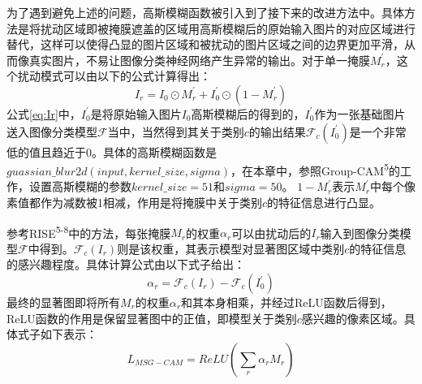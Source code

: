 为了遇到避免上述的问题，高斯模糊函数被引入到了接下来的改进方法中。具体方法是将扰动区域即被掩膜遮盖的区域用高斯模糊后的原始输入图片的对应区域进行替代，这样可以使得凸显的图片区域和被扰动的图片区域之间的边界更加平滑，从而像真实图片，不易让图像分类神经网络产生异常的输出。对于单一掩膜$M^{\prime}_r$，这个扰动模式可以由以下的公式计算得出：
\begin{equation}
	I_r=I_0\odot M^{\prime}_r+I^{\prime}_0\odot (1-M^{\prime}_r)
	\label{eq:Ir}
\end{equation}
公式\ref{eq:Ir}中，$I^{\prime}_0$是将原始输入图片$I_0$高斯模糊后的得到的，$I^{\prime}_0$作为一张基础图片送入图像分类模型$\mathcal{F}$当中，当然得到其关于类别$c$的输出结果$\mathcal{F}_c(I^{\prime}_0)$是一个非常低的值且趋近于0。具体的高斯模糊函数是$guassian\_blur2d(input,kernel\_size,sigma)$，在本章中，参照Group-CAM\textsuperscript{\cite{zhang2021novel}5}的工作，设置高斯模糊的参数$kernel\_size=51$和$sigma=50$。 $1-M^{\prime}_r$表示$M^{\prime}_r$中每个像素值都作为减数被1相减，作用是将掩膜中关于类别$c$的特征信息进行凸显。

参考RISE\textsuperscript{\cite{petsiuk2018rise}5-8}中的方法，每张掩膜$M_r$的权重$\alpha_r$可以由扰动后的$I_r$输入到图像分类模型$\mathcal{F}$中得到。$\mathcal{F}_c(I_r)$则是该权重，其表示模型对显著图区域中类别$c$的特征信息的感兴趣程度。具体计算公式由以下式子给出：
\begin{equation}
	\alpha_r=\mathcal{F}_c(I_r)-\mathcal{F}_c(I^{\prime}_0)
\end{equation}
最终的显著图即将所有$M_r$的权重$\alpha_r$和其本身相乘，并经过ReLU函数后得到，ReLU函数的作用是保留显著图中的正值，即模型关于类别$c$感兴趣的像素区域。具体式子如下表示：
\begin{equation}
	L_{MSG-CAM}=ReLU(\sum_{r}\alpha_r M_r)
\end{equation}
 
